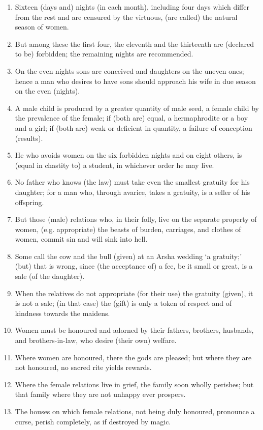 \begin{enumerate}
\item Sixteen (days and) nights (in each month), including four days which differ from the rest and are censured by the virtuous, (are called) the natural season of women.
\item But among these the first four, the eleventh and the thirteenth are (declared to be) forbidden; the remaining nights are recommended.
\item On the even nights sons are conceived and daughters on the uneven ones; hence a man who desires to have sons should approach his wife in due season on the even (nights).
\item A male child is produced by a greater quantity of male seed, a female child by the prevalence of the female; if (both are) equal, a hermaphrodite or a boy and a girl; if (both are) weak or deficient in quantity, a failure of conception (results).
\item He who avoids women on the six forbidden nights and on eight others, is (equal in chastity to) a student, in whichever order he may live.
\item No father who knows (the law) must take even the smallest gratuity for his daughter; for a man who, through avarice, takes a gratuity, is a seller of his offspring.
\item But those (male) relations who, in their folly, live on the separate property of women, (e.g. appropriate) the beasts of burden, carriages, and clothes of women, commit sin and will sink into hell.
\item Some call the cow and the bull (given) at an Arsha wedding `a gratuity;' (but) that is wrong, since (the acceptance of) a fee, be it small or great, is a sale (of the daughter).
\item When the relatives do not appropriate (for their use) the gratuity (given), it is not a sale; (in that case) the (gift) is only a token of respect and of kindness towards the maidens.
\item Women must be honoured and adorned by their fathers, brothers, husbands, and brothers-in-law, who desire (their own) welfare.
\item Where women are honoured, there the gods are pleased; but where they are not honoured, no sacred rite yields rewards.
\item Where the female relations live in grief, the family soon wholly perishes; but that family where they are not unhappy ever prospers.
\item The houses on which female relations, not being duly honoured, pronounce a curse, perish completely, as if destroyed by magic.

\end{enumerate}
